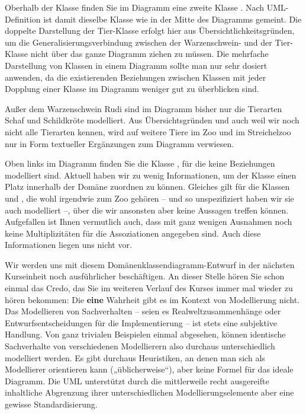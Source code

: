Oberhalb der Klasse  finden Sie im Diagramm eine zweite Klasse . Nach UML-Definition ist damit dieselbe Klasse  wie in der Mitte des Diagramms gemeint. Die doppelte Darstellung der Tier-Klasse erfolgt hier aus Übersichtlichkeitsgründen, um die Generalisierungsverbindung zwischen der Warzenschwein- und der Tier-Klasse nicht über das ganze Diagramm ziehen zu müssen. Die mehrfache Darstellung von Klassen in einem Diagramm sollte man nur sehr dosiert anwenden, da die existierenden Beziehungen zwischen Klassen mit jeder Dopplung einer Klasse im Diagramm weniger gut zu überblicken sind.

Außer dem Warzenschwein Rudi sind im Diagramm bisher nur die Tierarten Schaf und Schildkröte modelliert. Aus Übersichtsgründen und auch weil wir noch nicht alle Tierarten kennen, wird auf weitere Tiere im Zoo und im Streichelzoo nur in Form textueller Ergänzungen zum Diagramm verwiesen. 

Oben links im Diagramm finden Sie die Klasse , für die keine Beziehungen modelliert sind. Aktuell haben wir zu wenig Informationen, um der Klasse  einen Platz innerhalb der Domäne zuordnen zu können. Gleiches gilt für die Klassen  und , die wohl irgendwie zum Zoo gehören – und so unspezifiziert haben wir sie auch modelliert –, über die wir ansonsten aber keine Aussagen treffen können. Aufgefallen ist Ihnen vermutlich auch, dass mit ganz wenigen Ausnahmen noch keine Multiplizitäten für die Assoziationen angegeben sind. Auch diese Informationen liegen uns nicht vor.

Wir  werden uns mit diesem Domänenklassendiagramm-Entwurf in der nächsten Kurseinheit noch ausführlicher beschäftigen. An dieser Stelle hören Sie schon einmal das Credo, das Sie im weiteren Verlauf des Kurses immer mal wieder zu hören bekommen: Die \textbf{eine} Wahrheit gibt es im Kontext von Modellierung nicht. Das Modellieren
von Sachverhalten – seien es Realweltzusammenhänge oder Entwurfsentscheidungen für die Implementierung – ist stets eine subjektive Handlung. Von ganz trivialen Beispielen einmal abgesehen, können identische Sachverhalte von verschiedenen Modellierern also durchaus unterschiedlich modelliert werden. Es gibt durchaus Heuristiken, an denen man sich als Modellierer orientieren kann („üblicherweise“), aber keine Formel für das ideale Diagramm. Die UML unterstützt durch die mittlerweile recht ausgereifte inhaltliche Abgrenzung ihrer unterschiedlichen Modellierungselemente aber eine gewisse Standardisierung. 